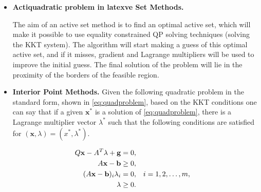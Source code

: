 \begin{itemize}

\item \textbf{Actiquadratic problem in latexve Set Methods.} 

 


The aim of an active set method is to find an optimal active set, which will make it possible to use equality constrained QP solving techniques (solving the KKT system). The algorithm will start making a guess of this optimal active set, and if it misses, gradient and Lagrange multipliers will be used to improve the initial guess. The final solution of the problem will lie in the proximity of the borders of the  feasible region.

\item \textbf{Interior Point Methods.} Given the following quadratic problem in the standard form, shown in \ref{eq:quadproblem}, based on the KKT conditions one can say that if a given $\mathbf{x}^*$ is a solution of \ref{eq:quadproblem}, there is a Lagrange multiplier vector $\lambda^*$ such that the following conditions are satisfied for $(\mathbf{x}, \lambda) = (x^*, \lambda^*)$.

\begin{equation} \label{eq:KKTIP}
 \begin{subequations}
 \begin{aligned}
  Q\mathbf{x} - A^{T}\lambda + \mathbf{g} &= 0, \\
  A\mathbf{x} - \mathbf{b} &\geq 0, \\ 
  (A\mathbf{x} - \mathbf{b})_{i}\lambda_{i} &= 0, && i = 1, 2, \ldots , m, \\
  \lambda &\geq 0. 
 \end{aligned}
 \end{subequations}
\end{equation}


\end{itemize}
